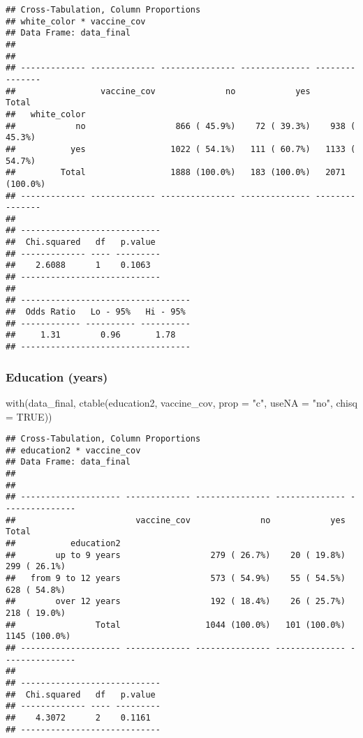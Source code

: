 \documentclass[
]{article}
\newenvironment{Shaded}{\begin{snugshade}}{\end{snugshade}}
\newcommand{\AttributeTok}[1]{\textcolor[rgb]{0.77,0.63,0.00}{#1}}
\newcommand{\ConstantTok}[1]{\textcolor[rgb]{0.00,0.00,0.00}{#1}}
\newcommand{\FunctionTok}[1]{\textcolor[rgb]{0.00,0.00,0.00}{#1}}
\newcommand{\NormalTok}[1]{#1}
\newcommand{\StringTok}[1]{\textcolor[rgb]{0.31,0.60,0.02}{#1}}
\begin{document}
\begin{verbatim}
## Cross-Tabulation, Column Proportions  
## white_color * vaccine_cov  
## Data Frame: data_final  
## 
## 
## ------------- ------------- --------------- -------------- ---------------
##                 vaccine_cov              no            yes           Total
##   white_color                                                             
##            no                  866 ( 45.9%)    72 ( 39.3%)    938 ( 45.3%)
##           yes                 1022 ( 54.1%)   111 ( 60.7%)   1133 ( 54.7%)
##         Total                 1888 (100.0%)   183 (100.0%)   2071 (100.0%)
## ------------- ------------- --------------- -------------- ---------------
## 
## ----------------------------
##  Chi.squared   df   p.value 
## ------------- ---- ---------
##    2.6088      1    0.1063  
## ----------------------------
## 
## ----------------------------------
##  Odds Ratio   Lo - 95%   Hi - 95% 
## ------------ ---------- ----------
##     1.31        0.96       1.78   
## ----------------------------------
\end{verbatim}

\hypertarget{education-years}{%
\subsubsection{Education (years)}\label{education-years}}

\begin{Shaded}
\begin{Highlighting}[]
\FunctionTok{with}\NormalTok{(data\_final, }\FunctionTok{ctable}\NormalTok{(education2, vaccine\_cov, }\AttributeTok{prop =} \StringTok{"c"}\NormalTok{, }\AttributeTok{useNA =} \StringTok{"no"}\NormalTok{, }\AttributeTok{chisq =} \ConstantTok{TRUE}\NormalTok{))}
\end{Highlighting}
\end{Shaded}

\begin{verbatim}
## Cross-Tabulation, Column Proportions  
## education2 * vaccine_cov  
## Data Frame: data_final  
## 
## 
## -------------------- ------------- --------------- -------------- ---------------
##                        vaccine_cov              no            yes           Total
##           education2                                                             
##        up to 9 years                  279 ( 26.7%)    20 ( 19.8%)    299 ( 26.1%)
##   from 9 to 12 years                  573 ( 54.9%)    55 ( 54.5%)    628 ( 54.8%)
##        over 12 years                  192 ( 18.4%)    26 ( 25.7%)    218 ( 19.0%)
##                Total                 1044 (100.0%)   101 (100.0%)   1145 (100.0%)
## -------------------- ------------- --------------- -------------- ---------------
## 
## ----------------------------
##  Chi.squared   df   p.value 
## ------------- ---- ---------
##    4.3072      2    0.1161  
## ----------------------------
\end{verbatim}
\end{document}
